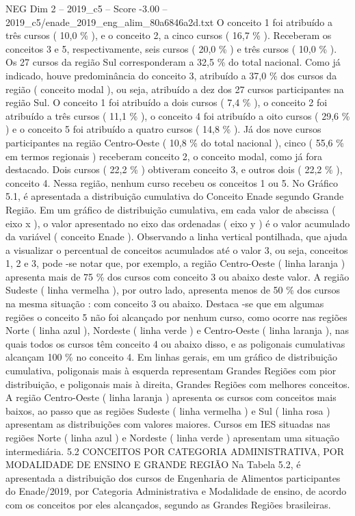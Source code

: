 \begin{textsample}{NEG Dim 2 – 2019\_c5 – Score -3.00 – 2019\_c5/enade\_2019\_eng\_alim\_80a6846a2d.txt}
O conceito 1 foi atribuído a três cursos ( 10,0 \% ), e o conceito 2, a cinco cursos ( 16,7 \% ).
Receberam os conceitos 3 e 5, respectivamente, seis cursos ( 20,0 \% ) e três cursos ( 10,0 \% ).
Os 27 cursos da região Sul corresponderam a 32,5 \% do total nacional.
Como já indicado, houve predominância do conceito 3, atribuído a 37,0 \% dos cursos da região ( conceito modal ), ou seja, atribuído a dez dos 27 cursos participantes na região Sul.
O conceito 1 foi atribuído a dois cursos ( 7,4 \% ), o conceito 2 foi atribuído a três cursos ( 11,1 \% ), o conceito 4 foi atribuído a oito cursos ( 29,6 \% ) e o conceito 5 foi atribuído a quatro cursos ( 14,8 \% ).
Já dos nove cursos participantes na região Centro-Oeste ( 10,8 \% do total nacional ), cinco ( 55,6 \% em termos regionais ) receberam conceito 2, o conceito modal, como já fora destacado.
Dois cursos ( 22,2 \% ) obtiveram conceito 3, e outros dois ( 22,2 \% ), conceito 4.
Nessa região, nenhum curso recebeu os conceitos 1 ou 5.
No Gráfico 5.1, é apresentada a distribuição cumulativa do Conceito Enade segundo Grande Região.
Em um gráfico de distribuição cumulativa, em cada valor de abscissa ( eixo x ), o valor apresentado no eixo das ordenadas ( eixo y ) é o valor acumulado da variável ( conceito Enade ).
Observando a linha vertical pontilhada, que ajuda a visualizar o percentual de conceitos acumulados até o valor 3, ou seja, conceitos 1, 2 e 3, pode -se notar que, por exemplo, a região Centro-Oeste ( linha laranja ) apresenta mais de 75 \% dos cursos com conceito 3 ou abaixo deste valor.
A região Sudeste ( linha vermelha ), por outro lado, apresenta menos de 50 \% dos cursos na mesma situação : com conceito 3 ou abaixo.
Destaca -se que em algumas regiões o conceito 5 não foi alcançado por nenhum curso, como ocorre nas regiões Norte ( linha azul ), Nordeste ( linha verde ) e Centro-Oeste ( linha laranja ), nas quais todos os cursos têm conceito 4 ou abaixo disso, e as poligonais cumulativas alcançam 100 \% no conceito 4.
Em linhas gerais, em um gráfico de distribuição cumulativa, poligonais mais à esquerda representam Grandes Regiões com pior distribuição, e poligonais mais à direita, Grandes Regiões com melhores conceitos.
A região Centro-Oeste ( linha laranja ) apresenta os cursos com conceitos mais baixos, ao passo que as regiões Sudeste ( linha vermelha ) e Sul ( linha rosa ) apresentam as distribuições com valores maiores.
Cursos em IES situadas nas regiões Norte ( linha azul ) e Nordeste ( linha verde ) apresentam uma situação intermediária. 5.2 CONCEITOS POR CATEGORIA ADMINISTRATIVA, POR MODALIDADE DE ENSINO E GRANDE REGIÃO Na Tabela 5.2, é apresentada a distribuição dos cursos de Engenharia de Alimentos participantes do Enade/2019, por Categoria Administrativa e Modalidade de ensino, de acordo com os conceitos por eles alcançados, segundo as Grandes Regiões brasileiras.

\end{textsample}
